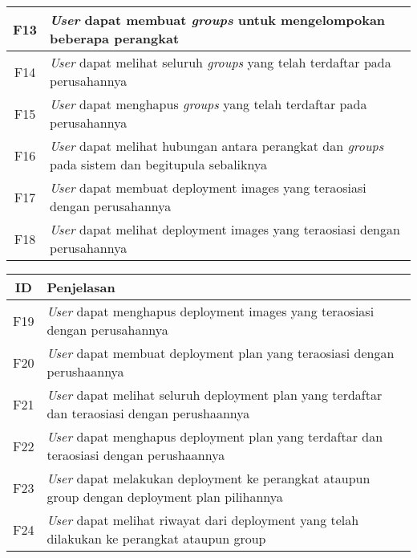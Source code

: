 \begin{table}[ht]
\begin{tabular}{|c|p{12cm}|}
    \hline
    F13 & \textit{User} dapat membuat \textit{groups} untuk mengelompokan beberapa perangkat                              \\
    \hline
    F14 & \textit{User} dapat melihat seluruh \textit{groups} yang telah terdaftar pada perusahannya                      \\
    \hline
    F15 & \textit{User} dapat menghapus \textit{groups} yang telah terdaftar pada perusahannya                            \\
    \hline
    F16 & \textit{User} dapat melihat hubungan antara perangkat dan \textit{groups} pada sistem dan begitupula sebaliknya \\
    \hline
    F17 & \textit{User} dapat membuat deployment images yang teraosiasi dengan perusahannya                               \\
    \hline
    F18 & \textit{User} dapat melihat deployment images yang teraosiasi dengan perusahannya                               \\
    \hline
  \end{tabular}
\end{table}
\egroup

\pagebreak

\bgroup
\begin{table}[ht]
  \def\arraystretch{1.7}
  \centering
  \begin{tabular}{|c|p{12cm}|}
    \hline
    ID  & Penjelasan                                                                                            \\

    \hline
    F19 & \textit{User} dapat menghapus deployment images yang teraosiasi dengan perusahannya                   \\
    \hline
    F20 & \textit{User} dapat membuat deployment plan yang teraosiasi dengan perushaannya                       \\
    \hline
    F21 & \textit{User} dapat melihat seluruh deployment plan yang terdaftar dan teraosiasi dengan perushaannya \\
    \hline
    F22 & \textit{User} dapat menghapus deployment plan yang terdaftar dan teraosiasi dengan perushaannya       \\
    \hline
    F23 & \textit{User} dapat melakukan deployment ke perangkat ataupun group dengan deployment plan pilihannya \\
    \hline
    F24 & \textit{User} dapat melihat riwayat dari deployment yang telah dilakukan ke perangkat ataupun group   \\
    \hline
  \end{tabular}
\end{table}
\egroup

